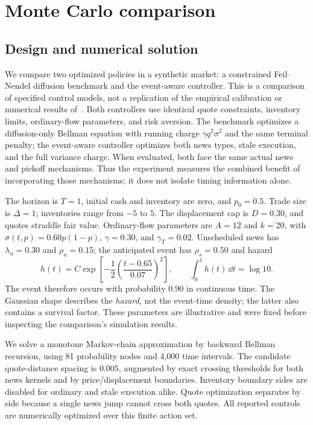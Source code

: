 \section{Monte Carlo comparison}
\label{sec:mc}
\subsection{Design and numerical solution}
We compare two optimized policies in a synthetic market: a constrained
Feil--Nendel diffusion benchmark and the event-aware controller. This is a
comparison of specified control models, not a replication of the empirical
calibration or numerical results of~\cite{feilnendel2026}. Both controllers use
identical quote constraints, inventory limits, ordinary-flow parameters, and
risk aversion. The benchmark optimizes a diffusion-only Bellman equation with
running charge $\gamma q^2\sigma^2$ and the same terminal penalty; the event-aware
controller optimizes both news types, stale execution, and the full variance
charge. When evaluated, both face the same actual news and pickoff mechanisms.
Thus the experiment measures the combined benefit of incorporating those
mechanisms; it does not isolate timing information alone.

The horizon is $T=1$, initial cash and inventory are zero, and $p_0=0.5$.
Trade size is $\Delta=1$; inventories range from $-5$ to $5$. The displacement
cap is $D=0.30$, and quotes straddle fair value. Ordinary-flow parameters are
$A=12$ and $k=20$, with $\sigma(t,p)=0.60p(1-p)$, $\gamma=0.30$, and
$\gamma_T=0.02$. Unscheduled news has $\lambda_u=0.30$ and $\rho_u=0.15$;
the anticipated event has $\rho_s=0.50$ and hazard
\begin{equation}
 h(t)=C\exp\!\left[-\frac12\left(\frac{t-0.65}{0.07}\right)^2\right],
 \qquad \int_0^1 h(t)\,\dd t=\log 10.
\end{equation}
The event therefore occurs with probability $0.90$ in continuous time. The
Gaussian shape describes the \emph{hazard}, not the event-time density; the
latter also contains a survival factor. These parameters are illustrative and
were fixed before inspecting the comparison's simulation results.

We solve a monotone Markov-chain approximation by backward Bellman recursion,
using 81 probability nodes and 4,000 time intervals. The candidate quote-distance
spacing is $0.005$, augmented by exact crossing thresholds for both news kernels
and by price/displacement boundaries. Inventory boundary sides are disabled
for ordinary and stale execution alike. Quote optimization separates by side
because a single news jump cannot cross both quotes. All reported controls are
numerically optimized over this finite action set.


